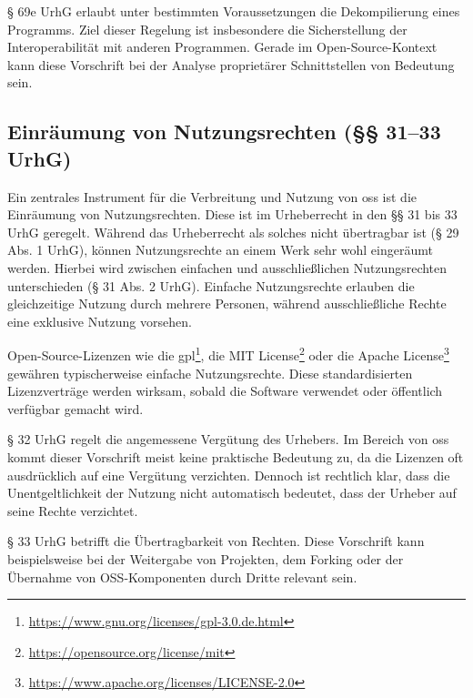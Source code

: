 § 69e UrhG erlaubt unter bestimmten Voraussetzungen die Dekompilierung eines Programms.
Ziel dieser Regelung ist insbesondere die Sicherstellung der Interoperabilität mit anderen Programmen.
Gerade im Open-Source-Kontext kann diese Vorschrift bei der Analyse proprietärer Schnittstellen von Bedeutung sein.


\subsection{Einräumung von Nutzungsrechten (§§ 31–33 UrhG)}

Ein zentrales Instrument für die Verbreitung und Nutzung von \gls{oss} ist die Einräumung von Nutzungsrechten.
Diese ist im Urheberrecht in den §§ 31 bis 33 UrhG geregelt.
Während das Urheberrecht als solches nicht übertragbar ist (§ 29 Abs. 1 UrhG), können Nutzungsrechte an einem Werk sehr wohl eingeräumt werden.
Hierbei wird zwischen einfachen und ausschließlichen Nutzungsrechten unterschieden (§ 31 Abs. 2 UrhG).
Einfache Nutzungsrechte erlauben die gleichzeitige Nutzung durch mehrere Personen, während ausschließliche Rechte eine exklusive Nutzung vorsehen.

Open-Source-Lizenzen wie die \gls{gpl}\footnote{\url{https://www.gnu.org/licenses/gpl-3.0.de.html}}, die MIT License\footnote{\url{https://opensource.org/license/mit}} oder die Apache
License\footnote{\url{https://www.apache.org/licenses/LICENSE-2.0}} gewähren typischerweise einfache Nutzungsrechte.
Diese standardisierten Lizenzverträge werden wirksam, sobald die Software verwendet oder öffentlich verfügbar gemacht wird.

§ 32 UrhG regelt die angemessene Vergütung des Urhebers.
Im Bereich von \gls{oss} kommt dieser Vorschrift meist keine praktische Bedeutung zu, da die Lizenzen oft ausdrücklich auf eine Vergütung verzichten.
Dennoch ist rechtlich klar, dass die Unentgeltlichkeit der Nutzung nicht automatisch bedeutet, dass der Urheber auf seine Rechte verzichtet.

§ 33 UrhG betrifft die Übertragbarkeit von Rechten.
Diese Vorschrift kann beispielsweise bei der Weitergabe von Projekten, dem Forking oder der Übernahme von OSS-Komponenten durch Dritte relevant sein.


